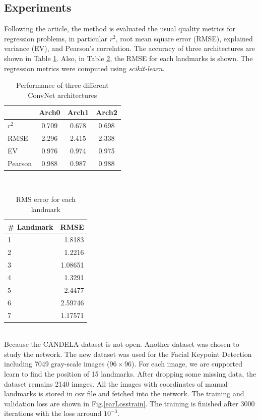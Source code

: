 \subsection{Experiments}
Following the article, the method is evaluated the usual quality metrics for regression problems, in particular $r^2$, root mean square error (RMSE), explained variance (EV), and Pearson's correlation. The accuracy of three architectures are shown in Table \ref{tbear1}. Also, in Table \ref{tbear2}, the RMSE for each landmarks is shown. The regression metrics were computed using \textit{scikit-learn}\cite{}.
\begin{table}[h!]
	\centering
	\begin{tabular}{l c c c}
	& Arch0 & Arch1 & Arch2 \\ \hline
	$r^2$ & 0.709 & 0.678 & 0.698 \\ \hline
	RMSE & 2.296 & 2.415 & 2.338\\ \hline
	EV & 0.976 & 0.974 &  0.975 \\ \hline
	Pearson & 0.988 & 0.987 &  0.988 \\ \hline	
	\end{tabular}
	\caption{Performance of three different ConvNet architectures}
	\label{tbear1}
\end{table}\\
\begin{table}[h!]
	\centering
	\begin{tabular}{l r}
	\# Landmark & RMSE \\ \hline
	1 & 1.8183 \\ \hline
	2 & 1.2216\\ \hline
	3 &  1.08651\\ \hline
	4 &  1.3291\\ \hline
	5 &  2.4477\\ \hline
	6 &  2.59746\\ \hline
	7 &  1.17571\\ \hline
	\end{tabular}
	\caption{RMS error for each landmark}
	\label{tbear2}
\end{table}\\
Because the CANDELA dataset is not open. Another dataset was chosen to study the network. The new dataset was used for the Facial Keypoint Detection including 7049 gray-scale images ($96 \times 96$). For each image, we are supported learn to find the position of 15 landmarks. After dropping some missing data, the dataset remains 2140 images. All the images with coordinates of manual landmarks is stored in csv file and fetched into the network. The training and validation loss are shown in Fig.\ref{earLosstrain}. The training is finished after 3000 iterations with the loss arround $10^{-3}$.
